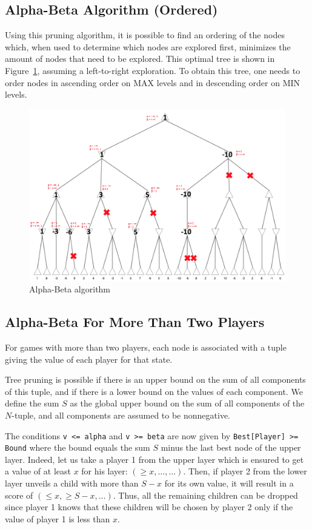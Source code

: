 \documentclass[journal,onecolumn]{IEEEtran}
\newcommand{\py}[1]{\texttt{#1}}
\begin{document}
\subsection{Alpha-Beta Algorithm (Ordered)}
Using this pruning algorithm, it is possible to find an ordering of the nodes which, when used to determine which nodes are explored first, minimizes the amount of nodes that need to be explored.
This optimal tree is shown in Figure~\ref{fig:alphabeta_ordered}, assuming a left-to-right exploration.
To obtain this tree, one needs to order nodes in ascending order on MAX levels and in descending order on MIN levels.
\begin{figure}[H]
 \centering
 \includegraphics[width=\textwidth]{img/Alphabeta_ordered.png}
 \caption{Alpha-Beta algorithm}
 \label{fig:alphabeta_ordered}
\end{figure}

\subsection{Alpha-Beta For More Than Two Players}
For games with more than two players, each node is associated with a tuple giving the value of each player for that state.

Tree pruning is possible if there is an upper bound on the sum of all components of this tuple, and if there is a lower bound on the values of each component.
We define the sum $S$ as the global upper bound on the sum of all components of the \(N\)-tuple, and all components are assumed to be nonnegative. 

The conditions \py{v <= alpha} and \py{v >= beta} are now given by \py{Best[Player] >= Bound} where the bound equals the sum $S$ minus the last best node of the upper layer.
Indeed, let us take a player 1 from the upper layer which is ensured to get a value of at least $x$ for his layer: $(\ge x, \dots, \dots)$. Then, if player 2 from the lower layer unveils a child with more than $S - x$ for its own value, it will result in a score of $(\le x, \ge S - x, \dots)$. Thus, all the remaining children can be dropped since player 1 knows that these children will be chosen by player 2 only if the value of player 1 is less than $x$. \cite{multiplayer}
\end{document}
